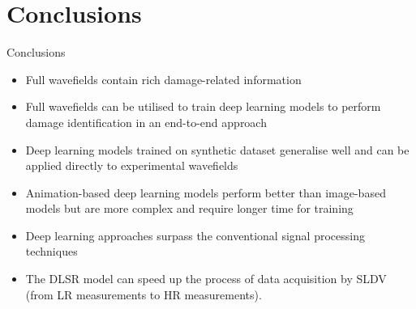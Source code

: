 \documentclass[10pt,aspectratio=169,dvipsnames]{beamer} %
\begin{document}
	\section{Conclusions}
	\begin{frame}{Conclusions}
		\footnotesize
		\begin{itemize}
			\item Full wavefields contain rich damage-related information
			\item Full wavefields can be utilised to train deep learning models to perform damage identification in an end-to-end approach
			\item Deep learning models trained on synthetic dataset generalise well and can be applied directly to experimental wavefields
			\item Animation-based deep learning models perform better than image-based models but are more complex and require longer time for training
			\item Deep learning approaches surpass the conventional signal processing techniques
			\item The DLSR model can speed up the process of data acquisition by SLDV (from LR measurements to HR measurements).
		\end{itemize}
	\end{frame}		
\end{document}
